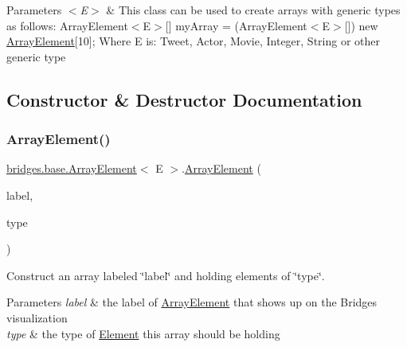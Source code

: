 \begin{DoxyParams}{Parameters}
{\em $<$\+E$>$} & This class can be used to create arrays with generic types as follows\+: Array\+Element$<$\+E$>$\mbox{[}\mbox{]} my\+Array = (Array\+Element$<$\+E$>$\mbox{[}\mbox{]}) new \mbox{\hyperlink{classbridges_1_1base_1_1_array_element}{Array\+Element}}\mbox{[}10\mbox{]}; Where E is\+: Tweet, Actor, Movie, Integer, String or other generic type \\
\hline
\end{DoxyParams}


\subsection{Constructor \& Destructor Documentation}
\mbox{\label{classbridges_1_1base_1_1_array_element_a90cbba952d50ff26fd2b89e9f3f81322}} 
\subsubsection{\texorpdfstring{Array\+Element()}{ArrayElement()}}
{\footnotesize\ttfamily \mbox{\hyperlink{classbridges_1_1base_1_1_array_element}{bridges.\+base.\+Array\+Element}}$<$ E $>$.\mbox{\hyperlink{classbridges_1_1base_1_1_array_element}{Array\+Element}} (\begin{DoxyParamCaption}\item[{String}]{label,  }\item[{E}]{type }\end{DoxyParamCaption})}

Construct an array labeled \char`\"{}label\char`\"{} and holding elements of \char`\"{}type\char`\"{}. ~\newline

\begin{DoxyParams}{Parameters}
{\em label} & the label of \mbox{\hyperlink{classbridges_1_1base_1_1_array_element}{Array\+Element}} that shows up on the Bridges visualization \\
\hline
{\em type} & the type of \mbox{\hyperlink{classbridges_1_1base_1_1_element}{Element}} this array should be holding \\
\hline
\end{DoxyParams}


